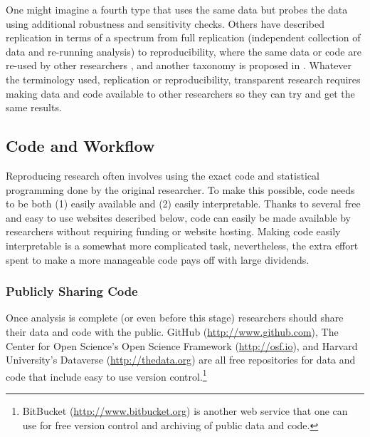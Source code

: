 \documentclass[12pt] {article}
\begin{document}
One might imagine a fourth type that uses the same data but probes the data using additional robustness and sensitivity checks. Others have described replication in terms of a spectrum from full replication (independent collection of data and re-running analysis) to
reproducibility, where the same data or code are re-used by other
researchers \citep{peng_reproducible_2011}, and another taxonomy is proposed in \cite{ClemensRepTax}. Whatever the terminology used, replication or reproducibility, transparent research requires making data and code available to other researchers so they can try and get the same results.


\subsection{Code and Workflow}\label{code-and-workflow}

Reproducing research often involves using the exact code and statistical
programming done by the original researcher. To make this possible, code
needs to be both (1) easily available and (2) easily interpretable.
Thanks to several free and easy to use websites described below, code
can easily be made available by researchers without requiring funding or
website hosting. Making code easily interpretable is a somewhat more complicated
task, nevertheless, the extra effort spent to make a more manageable
code pays off with large dividends.

\subsubsection{Publicly Sharing Code}\label{publicly-sharing-code}

Once analysis is complete (or even before this stage) researchers should
share their data and code with the public. GitHub
(\url{http://www.github.com}), The Center for Open Science's Open
Science Framework (\url{http://osf.io}), and Harvard University's
Dataverse (\url{http://thedata.org}) are all free repositories for data
and code that include easy to use version control.\footnote{BitBucket
  (\href{styles.xml}{http://www.bitbucket.org}) is another
  web service that one can use for free version control and archiving
  of public data and code.} 
  
\end{document}

